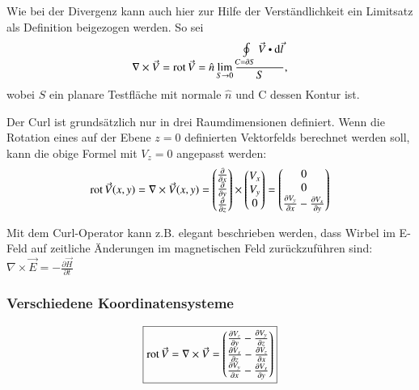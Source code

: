 Wie bei der Divergenz kann auch hier zur Hilfe der Verständlichkeit ein Limitsatz als Definition beigezogen werden.
So sei
\[
    \nabla\times\vec{V} = \rot \vec{V} = \hat{n} \lim_{S \to 0}\frac{\oint\limits_{C = \partial S}\vec{V} \dotp \diff \vec{l}}{S},
\]
wobei $S$ ein planare Testfläche mit normale $\hat{n}$ und C dessen Kontur ist. 


Der Curl ist grundsätzlich nur in drei Raumdimensionen definiert.
Wenn die Rotation eines auf der Ebene $z=0$ definierten Vektorfelds berechnet werden soll, kann die obige Formel mit $V_z = 0$ angepasst werden:
\[
    \operatorname{rot} \vec{V}(x, y)
    = \nabla \times \vec{V}(x, y)
    =   \begin{pmatrix}
            \frac{\partial}{\partial x}\\
            \frac{\partial}{\partial y}\\
            \frac{\partial}{\partial z}
        \end{pmatrix} \times 
    \begin{pmatrix}
        V_x \\ V_y \\ 0
    \end{pmatrix} =
    \begin{pmatrix}
        0 \\
        0 \\
        \frac{\partial V_y}{\partial x} - \frac{\partial V_x}{\partial y}
    \end{pmatrix}
\]

\begin{outline}
    \1 Mit dem Curl-Operator kann z.B. elegant beschrieben werden, dass Wirbel im E-Feld auf zeitliche Änderungen im magnetischen Feld zurückzuführen sind:
        \2[] $\nabla \times \vec{E} = -\frac{\partial \vec{H}}{\partial t}$
\end{outline}


\subsubsection{Verschiedene Koordinatensysteme}
\[
    \boxed{
        \operatorname{rot} \vec{V}
        = \nabla \times \vec{V}
        = \begin{pmatrix}
            \frac{\partial V_z}{\partial y} - \frac{\partial V_y}{\partial z}\\
            \frac{\partial V_x}{\partial z} - \frac{\partial V_z}{\partial x}\\
            \frac{\partial V_y}{\partial x} - \frac{\partial V_x}{\partial y}\\
        \end{pmatrix}
    }
\]

